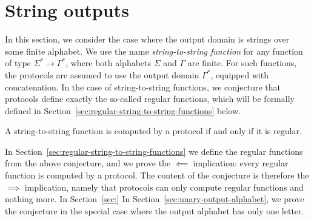 \section{String outputs}
\label{sec:string-outputs}

In this section, we consider the case where the output domain is strings over some finite alphabet. We use the name \emph{string-to-string function} for any function of type $\Sigma^* \to \Gamma^*$, where both alphabets $\Sigma$ and $\Gamma$ are finite. For such functions, the protocols are assumed to use the output domain $\Gamma^*$, equipped with concatenation. 
 In the case of string-to-string functions, we conjecture that protocols define exactly the so-called regular functions, which will be formally defined in Section~\ref{sec:regular-string-to-string-functions} below.
 


\begin{conjecture}\label{conj:protocol-regular-string-to-string}
    A string-to-string function is computed by a protocol if and only if it is regular. 
\end{conjecture}

In Section~\ref{sec:regular-string-to-string-functions} we  define the regular functions from the above conjecture, and we prove the $\impliedby$ implication: every regular function is computed by a protocol. The content of the conjecture is therefore the $\implies$ implication, namely that protocols can only compute regular functions and nothing more.  In Section~\ref{sec:} In Section~\ref{sec:unary-output-alphabet}, we prove the conjecture in the special case where the output alphabet has only one letter.




